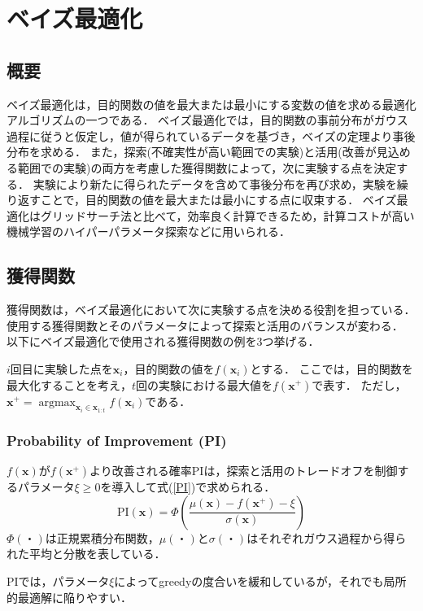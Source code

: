 \documentclass[a4paper,11pt]{jarticle}
\DeclareMathOperator*{\argmax}{argmax}
\begin{document}
\section{ベイズ最適化\cite{Brochu2010}}
\subsection{概要}
ベイズ最適化は，目的関数の値を最大または最小にする変数の値を求める最適化アルゴリズムの一つである．
ベイズ最適化では，目的関数の事前分布がガウス過程に従うと仮定し，値が得られているデータを基づき，ベイズの定理より事後分布を求める．
また，探索(不確実性が高い範囲での実験)と活用(改善が見込める範囲での実験)の両方を考慮した獲得関数によって，次に実験する点を決定する．
実験により新たに得られたデータを含めて事後分布を再び求め，実験を繰り返すことで，目的関数の値を最大または最小にする点に収束する．
ベイズ最適化はグリッドサーチ法と比べて，効率良く計算できるため，計算コストが高い機械学習のハイパーパラメータ探索などに用いられる．

\subsection{獲得関数}
獲得関数は，ベイズ最適化において次に実験する点を決める役割を担っている．使用する獲得関数とそのパラメータによって探索と活用のバランスが変わる．
以下にベイズ最適化で使用される獲得関数の例を3つ挙げる．

$i$回目に実験した点を$\mathbf{x}_i$，目的関数の値を$f(\mathbf{x}_i)$とする．
ここでは，目的関数を最大化することを考え，$t$回の実験における最大値を$f(\mathbf{x}^+)$で表す．
ただし，$\mathbf{x}^+ = \argmax_{\mathbf{x}_i \in \mathbf{x}_{1:t}} f(\mathbf{x}_i)$である．

\subsubsection{Probability of Improvement (PI)}
$f(\mathbf{x})$が$f(\mathbf{x}^+)$より改善される確率PIは，探索と活用のトレードオフを制御するパラメータ$\xi\geq0$を導入して式(\ref{PI})で求められる．
\begin{equation}
  \text{PI}(\mathbf{x})=\Phi \left(\frac{\mu(\mathbf{x})-f(\mathbf{x}^+)-\xi}{\sigma(\mathbf{x})}\right) \label{PI}
\end{equation}
$\Phi(・)$は正規累積分布関数，$\mu(・)$と$\sigma(・)$はそれぞれガウス過程から得られた平均と分散を表している．

PIでは，パラメータ$\xi$によってgreedyの度合いを緩和しているが，それでも局所的最適解に陥りやすい．
\end{document}

